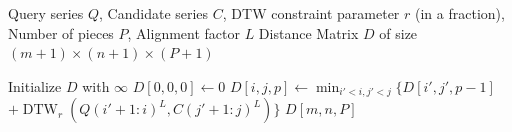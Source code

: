 \begin{algorithm}[t] %
	\caption{Naive PSDTW}
	\label{alg:psdtw}
	\begin{algorithmic}[1]
		\Require Query series $Q$, Candidate series $C$, DTW constraint parameter $r$ (in a fraction), Number of pieces $P$, Alignment factor $L$
		\Ensure Distance Matrix $D$ of size $(m+1) \times (n+1) \times (P+1)$
		
		\State Initialize $D$ with $\infty$
		\State $D[0,0,0] \gets 0$
		\State $D[i, j, p] \gets \min_{i' < i, j' < j} \big\{ D[i', j', p - 1]$
		\Statex \hspace{6em} $+ \operatorname{DTW}_r(Q(i'+1: i)^L, C(j'+1: j)^L) \big\}$
		\EndFor
		\EndFor
		\EndFor
		\State \Return $D[m, n, P]$
	\end{algorithmic}
\end{algorithm}
